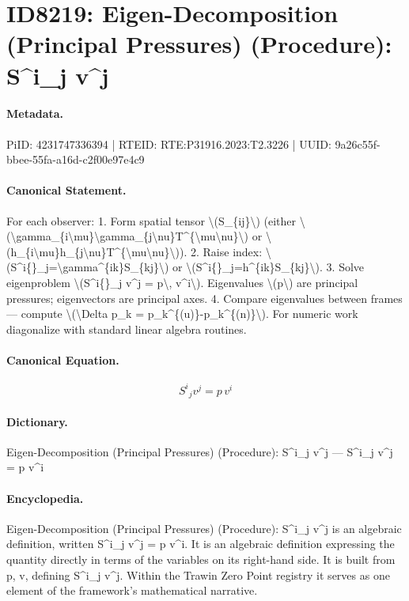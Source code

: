 \section*{ID8219: Eigen-Decomposition (Principal Pressures) (Procedure): S\textasciicircum{}i\_j v\textasciicircum{}j}
\paragraph{Metadata.}
PiID: 4231747336394 | RTEID: RTE:P31916.2023:T2.3226 | UUID: 9a26c55f-bbee-55fa-a16d-c2f00e97e4c9

\paragraph{Canonical Statement.}
For each observer: 1. Form spatial tensor \textbackslash{}(S\_\{ij\}\textbackslash{}) (either \textbackslash{}(\textbackslash{}gamma\_\{i\textbackslash{}mu\}\textbackslash{}gamma\_\{j\textbackslash{}nu\}T\textasciicircum{}\{\textbackslash{}mu\textbackslash{}nu\}\textbackslash{}) or \textbackslash{}(h\_\{i\textbackslash{}mu\}h\_\{j\textbackslash{}nu\}T\textasciicircum{}\{\textbackslash{}mu\textbackslash{}nu\}\textbackslash{})). 2. Raise index: \textbackslash{}(S\textasciicircum{}i\{\}\_j=\textbackslash{}gamma\textasciicircum{}\{ik\}S\_\{kj\}\textbackslash{}) or \textbackslash{}(S\textasciicircum{}i\{\}\_j=h\textasciicircum{}\{ik\}S\_\{kj\}\textbackslash{}). 3. Solve eigenproblem \textbackslash{}(S\textasciicircum{}i\{\}\_j v\textasciicircum{}j = p\textbackslash{}, v\textasciicircum{}i\textbackslash{}). Eigenvalues \textbackslash{}(p\textbackslash{}) are principal pressures; eigenvectors are principal axes. 4. Compare eigenvalues between frames — compute \textbackslash{}(\textbackslash{}Delta p\_k = p\_k\textasciicircum{}\{(u)\}-p\_k\textasciicircum{}\{(n)\}\textbackslash{}). For numeric work diagonalize with standard linear algebra routines.

\paragraph{Canonical Equation.}
\[
S^i{}_j v^j = p\, v^i
\]

\paragraph{Dictionary.}
Eigen-Decomposition (Principal Pressures) (Procedure): S\textasciicircum{}i\_j v\textasciicircum{}j — S\textasciicircum{}i\_j v\textasciicircum{}j = p v\textasciicircum{}i

\paragraph{Encyclopedia.}
Eigen-Decomposition (Principal Pressures) (Procedure): S\textasciicircum{}i\_j v\textasciicircum{}j is an algebraic definition, written S\textasciicircum{}i\_j v\textasciicircum{}j = p v\textasciicircum{}i. It is an algebraic definition expressing the quantity directly in terms of the variables on its right-hand side. It is built from p, v, defining S\textasciicircum{}i\_j v\textasciicircum{}j. Within the Trawin Zero Point registry it serves as one element of the framework's mathematical narrative.
